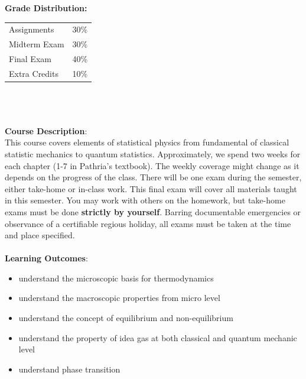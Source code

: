 \documentclass[11pt]{article}
\begin{document}
\textbf {\large Grade Distribution:} \\
\begin{tabular}{ l l }
Assignments    & 30\% \\
Midterm Exam   & 30\% \\
Final Exam     & 40\% \\
Extra Credits  & 10\% \\
\end{tabular} \\\\\\
\textbf {\large Course Description}:\\
This course covers elements of statistical physics from fundamental of classical statistic mechanics to quantum statistics. Approximately, we spend two weeks for each chapter (1-7 in Pathria's textbook). The weekly coverage might change as it depends on the progress of the class. There will be one exam during the semester, either take-home or in-class work. This final exam will cover all materials taught in this semester. You may work with others on the homework, but take-home exams must be done {\bf strictly by yourself}. Barring documentable emergencies or observance of a certifiable regious holiday, all exams must be taken at the time and place specified.
\\\\
\textbf {\large Learning Outcomes}:\\
\begin{itemize} 
\item understand the microscopic basis for thermodynamics
\item understand the macroscopic properties from micro level
\item understand the concept of equilibrium and non-equilibrium
\item understand the property of idea gas at both classical and quantum mechanic level
\item understand phase transition
\end{itemize}
\end{document}
